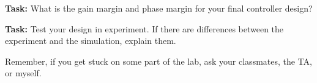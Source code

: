 \noindent \textbf{Task:}  What is the gain margin and phase margin for your
final controller design?


\noindent \textbf{Task:}  Test your design in experiment.  If there are
differences between the experiment and the simulation, explain them.  


\vspace{0.2in}
         

\noindent Remember, if you get stuck on some part of the lab, ask your
classmates, the TA, or myself.


